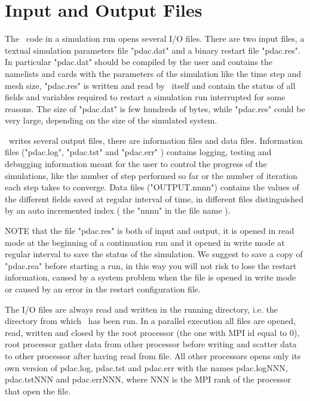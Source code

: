 
\section{Input and Output Files}
\label{section:files}

The \PDAC\  code in a simulation run opens several I/O files.
There are two input files, a textual simulation parameters file 
"pdac.dat" and a binary restart file "pdac.res". In particular
"pdac.dat" should be compiled by the user and contains the
namelists and cards with the parameters of the simulation
like the time step and mesh size, "pdac.res" is written
and read by \PDAC\ itself and contain the status of all
fields and variables required to restart a simulation run
interrupted for some reasons. The size of "pdac.dat" is
few hundreds of bytes, while "pdac.res" could be very large,
depending on the size of the simulated system. 

\PDAC\ writes several output files, there are information
files and data files. Information files ("pdac.log", "pdac.tst" and
"pdac.err" ) contains logging, testing and debugging information
meant for the user to control the progress of the simulations,
like the number of step performed so far or the number of iteration
each step takes to converge. Data files ("OUTPUT.nnnn") contains the values of the 
different fields saved at regular interval of time, in different 
files distinguished by an auto incremented index ( the "nnnn" in the file name ).

NOTE that the file "pdac.res" is both of input and output, 
it is opened in read mode at the beginning of a continuation run
and it opened in write mode at regular interval to save the status
of the simulation. We suggest to save a copy of "pdac.rea" before
starting a run, in this way you will not risk to lose the restart
information, caused by a system problem when the file is opened
in write mode or caused by an error in the restart configuration file.

The I/O files are always read and written in the running directory,
i.e. the directory from which \PDAC\ has been run.
In a parallel execution all files are opened, read, written and closed
by the root processor (the one with MPI id equal to 0),
root processor gather data from other processor before writing
and scatter data to other processor after having read from file.
All other processors opens only its own version of pdac.log, pdac.tst
and pdac.err with the names pdac.logNNN, pdac.tstNNN and pdac.errNNN,
where NNN is the MPI rank of the processor that open the file.
 
